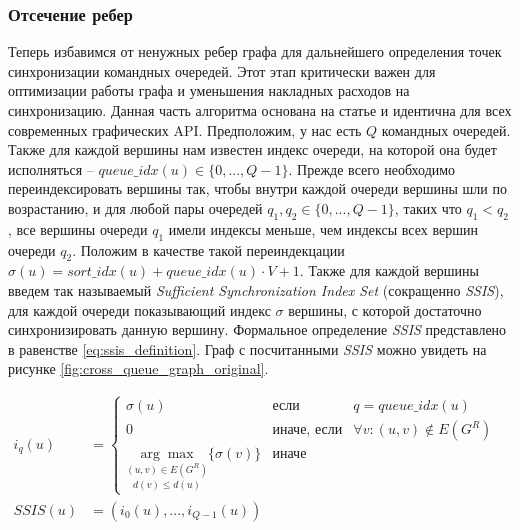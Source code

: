 \subsubsection{Отсечение ребер}
Теперь избавимся от ненужных ребер графа для дальнейшего определения точек синхронизации командных очередей. Этот этап критически важен для оптимизации работы графа и уменьшения накладных расходов на синхронизацию. Данная часть алгоритма основана на статье \cite{organizing_gpu_work_with_directed_acyclic_graphs} и идентична для всех современных графических API. Предположим, у нас есть $Q$ командных очередей. Также для каждой вершины нам известен индекс очереди, на которой она будет исполняться -- $queue\_idx(u) \in \{0,...,Q-1\}$. Прежде всего необходимо переиндексировать вершины так, чтобы внутри каждой очереди вершины шли по возрастанию, и для любой пары очередей $q_1, q_2 \in \{0,...,Q-1\}$, таких что $q_1 < q_2$, все вершины очереди $q_1$ имели индексы меньше, чем индексы всех вершин очереди $q_2$. Положим в качестве такой переиндекцации $\sigma(u) = sort\_idx(u) + queue\_idx(u) \cdot V + 1$. Также для каждой вершины введем так называемый \textit{Sufficient Synchronization Index Set} (сокращенно \textit{SSIS}), для каждой очереди показывающий индекс $\sigma$ вершины, с которой достаточно синхронизировать данную вершину. Формальное определение \textit{SSIS} представлено в равенстве \ref{eq:ssis_definition}. Граф с посчитанными \textit{SSIS} можно увидеть на рисунке \ref{fig:cross_queue_graph_original}.

\begin{align}
    i_{q}(u) &= \left\{ \begin{array}{rcl}
        \sigma(u) & \mbox{если} & q = queue\_idx(u) \\
        0 & \mbox{иначе, если} & \forall v: (u, v) \notin E(G^R) \\
        \underset{d(v) \leq d(u)}{\underset{(u,v) \in E(G^R)}{\arg\max}} \{\sigma(v)\} & \mbox{иначе}
    \end{array}\right.&\\
    SSIS(u) &= \left( i_0(u), ..., i_{Q-1}(u) \right) \label{eq:ssis_definition}
\end{align}

